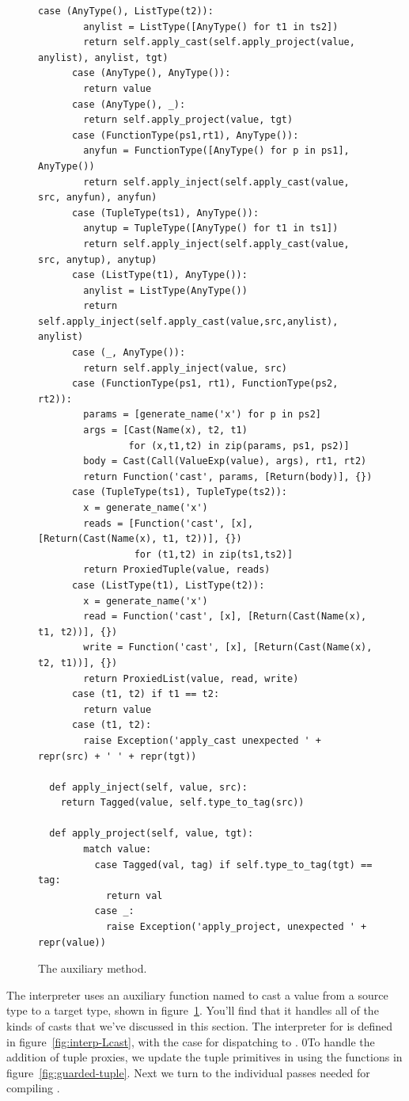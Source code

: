 \documentclass[7x10]{TimesAPriori_MIT}%
\def\racketEd{0}
\def\edition{0}
\newcommand{\racket}[1]{{\if\edition\racketEd{#1}\fi}}
\numberwithin{theorem}{chapter}
\numberwithin{definition}{chapter}
\numberwithin{equation}{chapter}
\begin{document}
\begin{figure}[tbp]
\begin{tcolorbox}[colback=white]
{\begin{lstlisting}[basicstyle=\ttfamily\footnotesize]
      case (AnyType(), ListType(t2)):
        anylist = ListType([AnyType() for t1 in ts2])
        return self.apply_cast(self.apply_project(value, anylist), anylist, tgt)
      case (AnyType(), AnyType()):
        return value
      case (AnyType(), _):
        return self.apply_project(value, tgt)
      case (FunctionType(ps1,rt1), AnyType()):
        anyfun = FunctionType([AnyType() for p in ps1], AnyType())
        return self.apply_inject(self.apply_cast(value, src, anyfun), anyfun)
      case (TupleType(ts1), AnyType()):
        anytup = TupleType([AnyType() for t1 in ts1])
        return self.apply_inject(self.apply_cast(value, src, anytup), anytup)
      case (ListType(t1), AnyType()):
        anylist = ListType(AnyType())
        return self.apply_inject(self.apply_cast(value,src,anylist), anylist)
      case (_, AnyType()):
        return self.apply_inject(value, src)
      case (FunctionType(ps1, rt1), FunctionType(ps2, rt2)):
        params = [generate_name('x') for p in ps2]
        args = [Cast(Name(x), t2, t1)
                for (x,t1,t2) in zip(params, ps1, ps2)]
        body = Cast(Call(ValueExp(value), args), rt1, rt2)
        return Function('cast', params, [Return(body)], {})
      case (TupleType(ts1), TupleType(ts2)):
        x = generate_name('x')
        reads = [Function('cast', [x], [Return(Cast(Name(x), t1, t2))], {})
                 for (t1,t2) in zip(ts1,ts2)]
        return ProxiedTuple(value, reads)
      case (ListType(t1), ListType(t2)):
        x = generate_name('x')
        read = Function('cast', [x], [Return(Cast(Name(x), t1, t2))], {})
        write = Function('cast', [x], [Return(Cast(Name(x), t2, t1))], {})
        return ProxiedList(value, read, write)
      case (t1, t2) if t1 == t2:
        return value
      case (t1, t2):
        raise Exception('apply_cast unexpected ' + repr(src) + ' ' + repr(tgt))

  def apply_inject(self, value, src):
    return Tagged(value, self.type_to_tag(src))

  def apply_project(self, value, tgt):
        match value:
          case Tagged(val, tag) if self.type_to_tag(tgt) == tag:
            return val
          case _:
            raise Exception('apply_project, unexpected ' + repr(value))
\end{lstlisting}
\fi}
\end{tcolorbox}
\caption{The  auxiliary method.}
  \label{fig:apply_cast}
\end{figure}

The \LangCast{} interpreter uses an auxiliary function named
 to cast a value from a source type to a target type,
shown in figure~\ref{fig:apply_cast}. You'll find that it handles all
of the kinds of casts that we've discussed in this section.
%
The interpreter for \LangCast{} is defined in
figure~\ref{fig:interp-Lcast}, with the case for 
dispatching to .
\racket{To handle the addition of tuple
proxies, we update the tuple primitives in \code{interp-op} using the
functions in figure~\ref{fig:guarded-tuple}.}
Next we turn to the individual passes needed for compiling \LangGrad{}.
\end{document}
